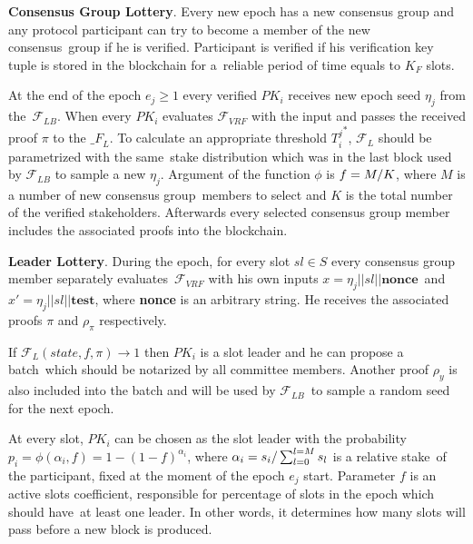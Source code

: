 \textbf{Consensus Group Lottery}.
Every new epoch has a new consensus group and any protocol participant can try to become a member of the new consensus\
group if he is verified.
Participant is verified if his verification key tuple is stored in the blockchain for a\
reliable period of time equals to $K_F$ slots.

At the end of the epoch ${e_j \geq 1}$ every verified $PK_i$ receives new epoch seed $\eta_j$ from the\
${\mathcal{F}}_{LB}$.
When every $PK_i$ evaluates ${\mathcal{F}}_{VRF}$ with the input
and passes the received proof $\pi$ to the ${\mathcal_{F}}_{L}$.
To calculate an appropriate threshold ${T_i^j}^*$, ${\mathcal{F}}_{L}$ should be parametrized with the same\
stake distribution which was in the last block used by ${\mathcal{F}}_{LB}$ to sample a new $\eta_j$.
Argument of the function $\phi$ is ${f = M /\/ K}$, where $M$ is a number of new consensus group\
members to select and $K$ is the total number of the verified stakeholders.
Afterwards every selected consensus group member includes the associated proofs into the blockchain.

\textbf{Leader Lottery}.
During the epoch, for every slot ${sl \in S}$ every consensus group member separately evaluates\
${\mathcal{F}}_{VRF}$ with his own inputs ${x = \eta_j || sl || \textbf{nonce}}$\
and ${x' = \eta_j || sl || \textbf{test}}$, where \textbf{nonce} is an arbitrary string.
He receives the associated proofs $\pi$ and $\rho_\pi$ respectively.

If ${\mathcal{F}}_{L}(state, f, \pi) \rightarrow 1$ then $PK_i$ is a slot leader and he can propose a batch\
which should be notarized by all committee members.
Another proof $\rho_y$ is also included into the batch and will be used by  ${\mathcal{F}}_{LB}$\
to sample a random seed for the next epoch.

At every slot, $PK_i$ can be chosen as the slot leader with the probability\
${p_i = \phi(\alpha_i, f) = 1-(1-f)^{\alpha_i}}$, where ${\alpha_i=s_i/\\\sum_{l=0}^{l=M} s_l}$ is a relative stake\
of the participant, fixed at the moment of the epoch $e_j$ start.
Parameter $f$ is an active slots coefficient, responsible for percentage of slots in the epoch which should have\
at least one leader.
In other words, it determines how many slots will pass before a new block is produced.

